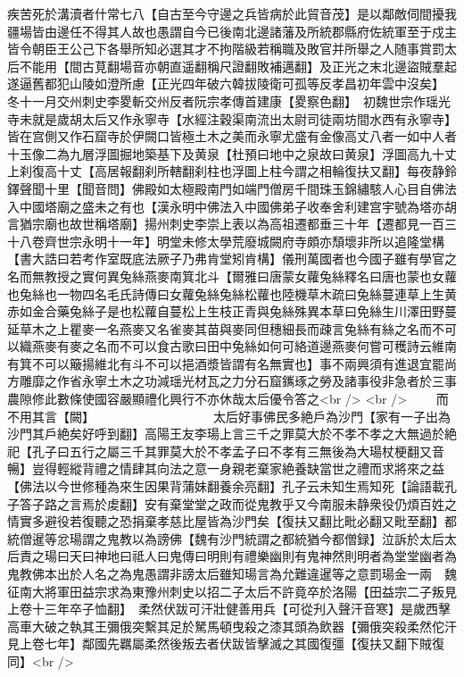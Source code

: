 疾苦死於溝瀆者什常七八【自古至今守邊之兵皆病於此貿音茂】是以鄰敵伺間擾我疆場皆由邊任不得其人故也愚謂自今已後南北邊諸藩及所統郡縣府佐統軍至于戍主皆令朝臣王公己下各舉所知必選其才不拘階級若稱職及敗官并所舉之人随事賞罰太后不能用【間古莧翻場音亦朝直遥翻稱尺證翻敗補邁翻】及正光之末北邊盜賊羣起遂逼舊都犯山陵如澄所慮【正光四年破六韓拔陵衛可孤等反孝昌初年雲中沒矣】　冬十一月交州刺史李畟斬交州反者阮宗孝傳首建康【畟察色翻】　初魏世宗作瑶光寺未就是歲胡太后又作永寧寺【水經注穀渠南流出太尉司徒兩坊間水西有永寧寺】皆在宫側又作石窟寺於伊闕口皆極土木之美而永寧尤盛有金像高丈八者一如中人者十玉像二為九層浮圖掘地築基下及黄泉【杜預曰地中之泉故曰黄泉】浮圖高九十丈上刹復高十丈【高居報翻刹所轄翻刹柱也浮圖上柱今謂之相輪復扶又翻】每夜静鈴鐸聲聞十里【聞音問】佛殿如太極殿南門如端門僧房千間珠玉錦繡駭人心目自佛法入中國塔廟之盛未之有也【漢永明中佛法入中國佛弟子收奉舍利建宫宇號為塔亦胡言猶宗廟也故世稱塔廟】揚州刺史李崇上表以為高祖遷都垂三十年【遷都見一百三十八卷齊世宗永明十一年】明堂未修太學荒廢城闕府寺頗亦頹壞非所以追隆堂構【書大誥曰若考作室既底法厥子乃弗肯堂矧肯構】儀刑萬國者也今國子雖有學官之名而無教授之實何異兔絲燕麥南箕北斗【爾雅曰唐蒙女蘿兔絲釋名曰唐也蒙也女蘿也兔絲也一物四名毛氏詩傳曰女蘿兔絲兔絲松蘿也陸機草木疏曰兔絲蔓連草上生黄赤如金合藥兔絲子是也松蘿自蔓松上生枝正青與兔絲殊異本草曰免絲生川澤田野蔓延草木之上瞿麥一名燕麥又名雀麥其苗與麥同但穗細長而疎言兔絲有絲之名而不可以織燕麥有麥之名而不可以食古歌曰田中兔絲如何可絡道邊燕麥何嘗可穫詩云維南有箕不可以簸揚維北有斗不可以挹酒漿皆謂有名無實也】事不兩興須有進退宜罷尚方雕靡之作省永寧土木之功減瑶光材瓦之力分石窟䥴琢之勞及諸事役非急者於三事農隙修此數條使國容嚴顯禮化興行不亦休哉太后優令答之<br />
<br />
　　而不用其言【闕】　　　　　　　　　　太后好事佛民多絶戶為沙門【家有一子出為沙門其戶絶矣好呼到翻】高陽王友李瑒上言三千之罪莫大於不孝不孝之大無過於絶祀【孔子曰五行之屬三千其罪莫大於不孝孟子曰不孝有三無後為大瑒杖梗翻又音暢】豈得輕縱背禮之情肆其向法之意一身親老棄家絶養缺當世之禮而求將來之益【佛法以今世修種為來生因果背蒲妹翻養余亮翻】孔子云未知生焉知死【論語載孔子答子路之言焉於䖍翻】安有棄堂堂之政而從鬼教乎又今南服未静衆役仍煩百姓之情實多避役若復聽之恐捐棄孝慈比屋皆為沙門矣【復扶又翻比毗必翻又毗至翻】都統僧暹等忿瑒謂之鬼教以為謗佛【魏有沙門統謂之都統猶今都僧録】泣訴於太后太后責之瑒曰天曰神地曰祗人曰鬼傳曰明則有禮樂幽則有鬼神然則明者為堂堂幽者為鬼教佛本出於人名之為鬼愚謂非謗太后雖知瑒言為允難違暹等之意罰瑒金一兩　魏征南大將軍田益宗求為東豫州刺史以招二子太后不許竟卒於洛陽【田益宗二子叛見上卷十三年卒子恤翻】　柔然伏跋可汗壯健善用兵【可從刋入聲汗音寒】是歲西擊高車大破之執其王彌俄突繫其足於駑馬頓曳殺之漆其頭為飲器【彌俄突殺柔然佗汗見上卷七年】鄰國先羈屬柔然後叛去者伏跋皆擊滅之其國復彊【復扶又翻下賊復同】<br />
